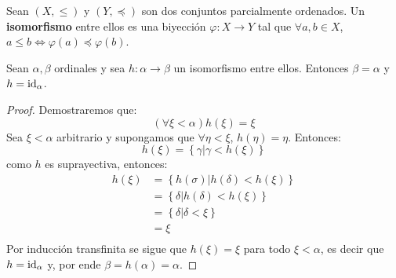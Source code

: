 \documentclass[12pt]{report}
\newcounter{it}
\theoremstyle{largebreak}
\newcommand\cf[3]{\ensuremath{#1:#2\rightarrow#3}}
\begin{document}
    \begin{mydef}
        Sean $(X,\leq)$ y $(Y,\preceq)$ son dos conjuntos parcialmente ordenados. Un \textbf{isomorfismo} entre ellos es una biyección $\cf{\varphi}{X}{Y}$ tal que $\forall a,b\in X$, $a\leq b\iff\varphi(a)\preceq\varphi(b)$.
    \end{mydef}

    \begin{lema}
        Sean $\alpha,\beta$ ordinales y sea $\cf{h}{\alpha}{\beta}$ un isomorfismo entre ellos. Entonces $\beta=\alpha$ y $h=\textup{id}_\alpha$.
    \end{lema}

    \begin{proof}
        Demostraremos que:
        \begin{equation*}
            (\forall\xi<\alpha) h(\xi)=\xi
        \end{equation*}
        Sea $\xi<\alpha$ arbitrario y supongamos que $\forall \eta<\xi$, $h(\eta)=\eta$. Entonces:
        \begin{equation*}
            h(\xi)=\left\{\gamma\Big|\gamma<h(\xi) \right\}
        \end{equation*}
        como $h$ es suprayectiva, entonces:
        \begin{equation*}
            \begin{split}
                h(\xi)&=\left\{h(\sigma)\Big|h(\delta)<h(\xi) \right\}\\
                &=\left\{\delta\Big|h(\delta)<h(\xi) \right\}\\
                &=\left\{\delta\Big|\delta<\xi \right\}\\
                &=\xi\\
            \end{split}
        \end{equation*}
        Por inducción transfinita se sigue que $h(\xi)=\xi$ para todo $\xi<\alpha$, es decir que $h=\textup{id}_\alpha$ y, por ende $\beta=h(\alpha)=\alpha$.
    \end{proof}
\end{document}
